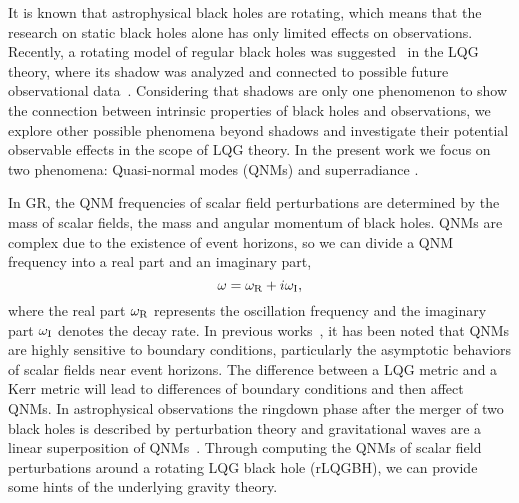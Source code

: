\documentclass[12pt]{article}
\begin{document}
 
It is known that astrophysical black holes are rotating, which means that the research on static black holes alone has only limited effects on observations.
Recently, a rotating model of regular black holes was suggested~\cite{Brahma:2020eos} in the LQG theory, where its shadow was analyzed and connected to possible future observational data~\cite{Afrin:2022ztr}.
Considering that shadows are only one phenomenon to show the connection between intrinsic properties of black holes and observations, we  
explore other possible phenomena beyond shadows and investigate their potential observable effects  in the scope of LQG theory. 
In the present work we focus on two phenomena: Quasi-normal modes (QNMs) \cite{Konoplya:2011qq,Kokkotas-Schmidt-1999,Li:2022kch,Franzin:2022iai} and superradiance \cite{Brito:2015oca,Li:2022kch,Franzin:2022iai}.

In GR, the QNM frequencies of scalar field perturbations are determined by the mass of scalar fields, the mass and angular momentum of black holes. QNMs are complex due to the existence of event horizons,  so we can divide a QNM frequency into a real part and an imaginary part,
\begin{equation}
    \omega=\omega_{\rm R}+i\omega_{\rm I},
\end{equation} 
where the real part $\omega_{\rm R}$ represents the oscillation frequency and the imaginary part $\omega_{\rm I}$ denotes the decay rate.  
In previous works~\cite{Konoplya:2011qq}, it has been noted that QNMs are highly sensitive to boundary conditions, particularly the asymptotic behaviors of scalar fields near event horizons.  The difference between a LQG metric and a Kerr metric will  lead to differences of boundary conditions and then affect QNMs. In astrophysical observations  the ringdown phase after the merger of two black holes is described by perturbation theory and gravitational waves are a linear superposition of QNMs~\cite{cardoso2016gravitational,gerosa2021hierarchical,Weih:2019xvw}. Through computing the QNMs of scalar field perturbations around a rotating LQG black hole (rLQGBH), we can provide some hints of the underlying gravity theory.
\end{document}
